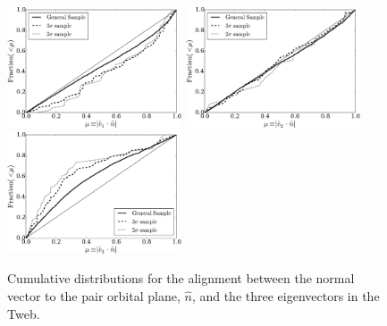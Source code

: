 \documentclass{emulateapj}
\begin{document}
\begin{figure}
\begin{center}
  \includegraphics[width=0.46\textwidth]{alignments_e1_n_all_environments.pdf} 
  \includegraphics[width=0.46\textwidth]{alignments_e2_n_all_environments.pdf} 
  \includegraphics[width=0.46\textwidth]{alignments_e3_n_all_environments.pdf} 
\end{center}
\caption{Cumulative distributions for the alignment between the normal
  vector to the pair orbital plane, $\hat{n}$, and the three eigenvectors in
  the Tweb.
    \label{fig:alignment_n}}  
\end{figure}
\end{document}
